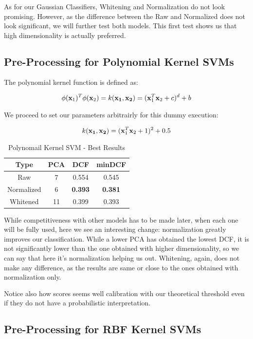 \documentclass[12pt, twocolumn]{article}
\begin{document}
As for our Gaussian Classifiers, Whitening and Normalization do not look promising. 
However, as the difference between the Raw and Normalized does not look significant,
we will further test both models.
This first test shows us that high dimensionality is actually preferred.

\subsection{Pre-Processing for Polynomial Kernel SVMs}

The polynomial kernel function is defined as:

$$ \phi({\bf x}_1)^T\phi({\bf x}_2) = k({\bf x_1}, {\bf x_2}) = ({\bf x}_1^T{\bf x}_2 + c)^d + b $$

We proceed to set our parameters arbitrairly for this dummy execution:

$$k({\bf x_1}, {\bf x_2}) = ({\bf x}_1^T{\bf x}_2+1)^2+0.5 $$

\begin{table}[H]
    \centering
        \begin{tabular}{||c|c|c|c||}
            \hline
            Type & PCA & DCF & minDCF \\
            \hline
            \hline
            Raw & 7 & 0.554 &  0.545  \\
            Normalized & 6 & {\bf 0.393} &  {\bf 0.381}  \\
            Whitened & 11 & 0.399 &  0.393  \\
            \hline
    \end{tabular}
    \caption{Polynomail Kernel SVM - Best Results}
\end{table}

While competitiveness with other models has to be made later, when each one will be fully used, here we see an interesting change:
normalization greatly improves our classification.
While a lower PCA has obtained the lowest DCF, it is not significantly lower than the one obtained with higher dimensionality, so we can say that here it's normalization helping us out.
Whitening, again, does not make any difference, as the results are same or close to the ones obtained with normalization only.

Notice also how scores seems well calibration with our theoretical threshold even if they do not have a probabilistic interpretation.

\subsection{Pre-Processing for RBF Kernel SVMs}
\end{document}

